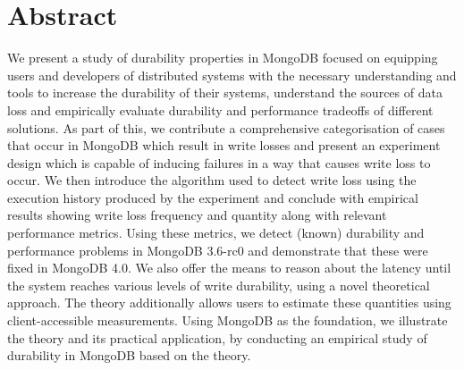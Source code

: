 \chapter*{Abstract}

We present a study of durability properties in MongoDB focused on equipping users and developers of distributed systems with the necessary understanding and tools to increase the durability of their systems, understand the sources of data loss and empirically evaluate durability and performance tradeoffs of different solutions. As part of this, we contribute a comprehensive categorisation of cases that occur in MongoDB which result in write losses and present an experiment design which is capable of inducing failures in a way that causes write loss to occur. We then introduce the algorithm used to detect write loss using the execution history produced by the experiment and conclude with empirical results showing write loss frequency and quantity along with relevant performance metrics. Using these metrics, we detect (known) durability and performance problems in MongoDB 3.6-rc0 and demonstrate that these were fixed in MongoDB 4.0.  We also offer the means to reason about the latency until the system reaches various levels of write durability, using a novel theoretical approach. The theory additionally allows users to estimate these quantities using client-accessible measurements. Using MongoDB as the foundation, we illustrate the theory and its practical application, by conducting an empirical study of durability in MongoDB based on the theory.
